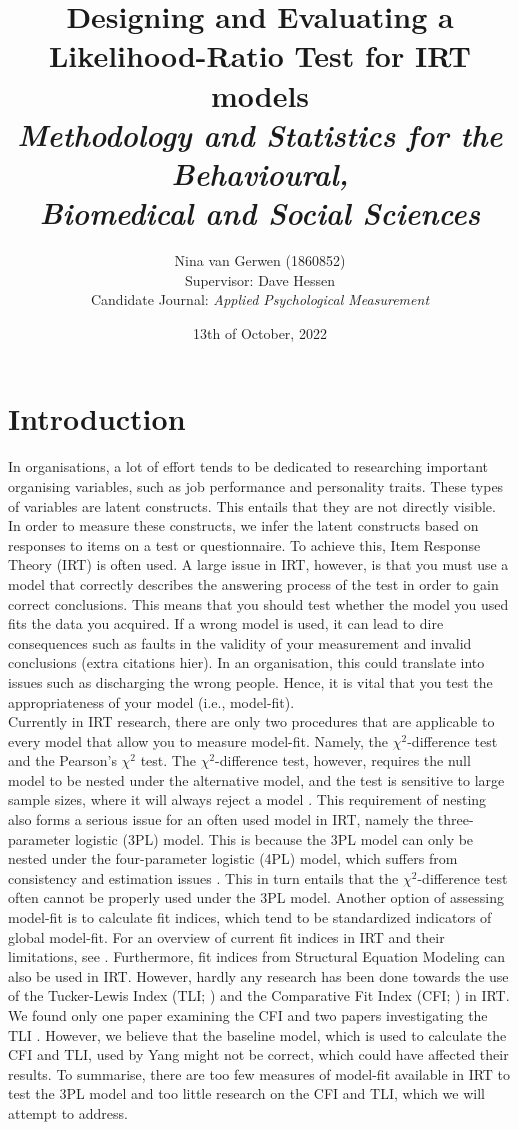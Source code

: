 \documentclass{article}
\title{%
	Designing and Evaluating a Likelihood-Ratio Test for IRT models \\
	\large \textit{Methodology and Statistics for the Behavioural, \\
	Biomedical and Social Sciences}}
\author{Nina van Gerwen (1860852) \\ 
	Supervisor: Dave Hessen \\ 
	\small {Candidate Journal: \textit{Applied Psychological Measurement}}}
\date{13th of October, 2022}
\begin{document}
\maketitle

\newpage

\part{Introduction}
In organisations, a lot of effort tends to be dedicated to researching important organising variables, such as job performance and personality traits. These types of variables are latent constructs. This entails that they are not directly visible. In order to measure these constructs, we infer the latent constructs based on responses to items on a test or questionnaire. To achieve this, Item Response Theory (IRT) is often used. A large issue in IRT, however, is that you must use a model that correctly describes the answering process of the test in order to gain correct conclusions. This means that you should test whether the model you used fits the data you acquired. If a wrong model is used, it can lead to dire consequences such as faults in the validity of your measurement \autocite{consq1} and invalid conclusions (extra citations hier). In an organisation, this could translate into issues such as discharging the wrong people. Hence, it is vital that you test the appropriateness of your model (i.e., model-fit). \\
\indent Currently in IRT research, there are only two procedures that are applicable to every model that allow you to measure model-fit. Namely, the $\chi^2$-difference test and the Pearson's $\chi^2$ test. The $\chi^2$-difference test, however, requires the null model to be nested under the alternative model, and the test is sensitive to large sample sizes, where it will always reject a model \autocite{chi2sens}. This requirement of nesting also forms a serious issue for an often used model in IRT, namely the three-parameter logistic (3PL) model. This is because the 3PL model can only be nested under the four-parameter logistic (4PL) model, which suffers from consistency and estimation issues \autocite{4plconsist1, 4plconsist2}. This in turn entails that the $\chi^2$-difference test often cannot be properly used under the 3PL model. 
Another option of assessing model-fit is to calculate fit indices, which tend to be standardized indicators of global model-fit. For an overview of current fit indices in IRT and their limitations, see \textcite{ref1}. Furthermore, fit indices from Structural Equation Modeling can also be used in IRT. However, hardly any research has been done towards the use of the Tucker-Lewis Index (TLI; \cite{tli}) and the Comparative Fit Index (CFI; \cite{cfi}) in IRT. We found only one paper examining the CFI \autocite{yangfitindex} and two papers investigating the TLI \autocite{yangfitindex, tliirt}. However, we believe that the baseline model, which is  used to calculate the CFI and  TLI, used by Yang might not be correct, which could have affected their results. To summarise, there are too few measures of model-fit available in IRT to test the 3PL model and too little research on the CFI and TLI, which we will attempt to address. \\
\end{document}
